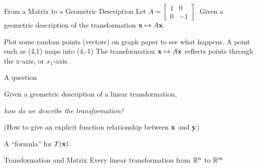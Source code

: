 \begin{frame}{From a Matrix to a Geometric Description}
Let $A=\begin{bmatrix}1&0\\0&-1\end{bmatrix}$. Given a geometric description of the transformation $\mathbf{x} \mapsto A \mathbf{x}$.

Plot some random points (vectors) on graph paper to see what happens. A point such as (4,1) maps into (4,-1) The transformation $\mathbf{x} \mapsto A \mathbf{x}$ reflects points through the x-axis, or $x_1$-axis.

\begin{center}
\end{center}
\end{frame}

\begin{frame}{A question}
\vfill
\begin{center}
{\Large Given a geometric description of a linear transformation,}

\bigskip
{\LARGE\color{red}\itshape how do we describe the transformation?}

\medskip
{\color{gray}(How to give an explicit function relationship between $\mathbf{x}$ and $\mathbf{y}$)}

\bigskip
{\Huge A ``formula'' for $T(\mathbf{x})$.}
\end{center}
\vfill
{}
\end{frame}

\begin{frame}{Transformation and Matrix}
\vfill
\centering
{\Large Every linear transformation from $\mathbb{R}^n$ to $\mathbb{R}^m$}

\vfill
{}
\end{frame}

